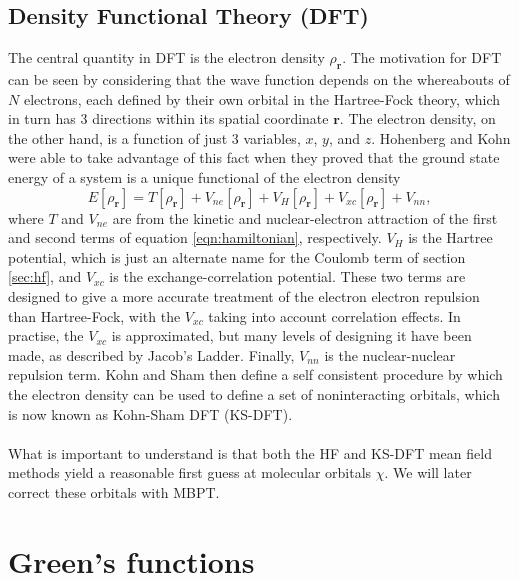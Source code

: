 \documentclass[12pt]{caltech_thesis}
\begin{document}
\subsection{Density Functional Theory (DFT)}
The central quantity in DFT is the electron density $\rho_\textbf{r} $. The motivation for DFT can be seen by considering that the wave function depends on the whereabouts of $N$ electrons, each defined by their own orbital in the Hartree-Fock theory, which in turn has 3 directions within its spatial coordinate $\textbf{r}$. The electron density, on the other hand, is a function of just 3 variables, $x$, $y$, and $z$. Hohenberg and Kohn were able to take advantage of this fact when they proved that the ground state energy of a system is a unique functional of the electron density \autocite{Hohenberg1964}
\begin{equation}
    E[\rho_\textbf{r} ] = T[\rho_\textbf{r} ] + V_{ne}[\rho_\textbf{r} ] + V_H[\rho_\textbf{r} ] + V_{xc}[\rho_\textbf{r} ] + V_{nn},
\end{equation}
where $T$ and $V_{ne}$ are from the kinetic and nuclear-electron attraction of the first and second terms of equation \ref{eqn:hamiltonian}, respectively. $V_H$ is the Hartree potential, which is just an alternate name for the Coulomb term of section \ref{sec:hf}, and $V_{xc}$ is the exchange-correlation potential. These two terms are designed to give a more accurate treatment of the electron electron repulsion than Hartree-Fock, with the $V_{xc}$ taking into account correlation effects.
 In practise, the $V_{xc}$ is approximated, but many levels of designing it have been made, as described by Jacob's Ladder. \autocite{milman_jacobs_2021} Finally, $V_{nn}$ is the nuclear-nuclear repulsion term. Kohn and Sham then define a self consistent procedure by which the electron density can be used to define a set of noninteracting orbitals, which is now known as Kohn-Sham DFT (KS-DFT).\autocite{PhysRev.140.A1133}
\\\\ What is important to understand is that both the HF and KS-DFT mean field methods yield a reasonable first guess \autocite{bruneval_gw_2021} at molecular orbitals $\chi$. We will later correct these orbitals with MBPT.
\section{Green's functions}
\end{document}
